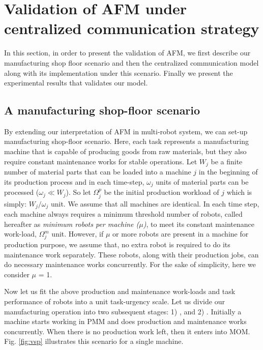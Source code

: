 \documentclass{intech}
\begin{document}
\section{Validation of AFM under centralized communication strategy}
In this section, in order to present the validation of AFM, we first describe our manufacturing shop floor scenario and then the centralized communication model along with its implementation under this scenario. Finally we present the experimental results that validates our model.
\subsection{A manufacturing shop-floor scenario}
\label{validation:scenario}
By extending our interpretation of AFM in multi-robot system, we can set-up manufacturing shop-floor  scenario. Here, each task represents a manufacturing machine that is  capable of producing goods from raw materials, but they also require constant maintenance works for stable operations. Let $W_{j}$ be a finite number of material parts that can be loaded into a machine $j$ in the beginning of its production process and in each time-step, $\omega_{j}$ units of material parts can be processed  ($\omega_{j} \ll W_{j} $). So let $\Omega_{j}^{p}$ be the initial production workload of $j$ which is simply: $W_{j} / \omega_{j}$ unit.
%
We assume that all machines are identical. In each time step, each machine always requires a minimum threshold number of robots, called hereafter as {\em minimum robots per machine ($\mu$)}, to meet its constant maintenance work-load, $\Omega_{j}^{m}$ unit. However, if $\mu$ or more robots are present in a machine for production purpose, we assume that, no extra robot is required to do its maintenance work separately. These robots, along with their production jobs, can do necessary maintenance works concurrently. For the sake of simplicity, here we consider $\mu$ = 1.

Now let us fit the above production and maintenance work-loads and task performance of robots into a unit task-urgency scale. Let us divide our manufacturing operation into two subsequent stages: 1) , and 2) . Initially a machine starts working in PMM and does production and maintenance works concurrently. When there is no production work left, then it  enters into MOM. Fig. \ref{fig:vsp} illustrates this scenario for a single machine.
\end{document}
